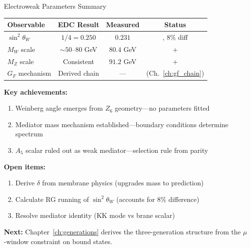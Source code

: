 \begin{statusbox}{Electroweak Parameters Summary}

\begin{center}
\renewcommand{\arraystretch}{1.3}
\begin{tabular}{lccc}
\toprule
\textbf{Observable} & \textbf{EDC Result} & \textbf{Measured} & \textbf{Status} \\
\midrule
$\sin^2\theta_W$ & $1/4 = 0.250$ & $0.231$ & \tagDc{}, 8\% diff \\
$M_W$ scale & $\sim 50$--$80$ GeV & $80.4$ GeV & \tagP{}+\tagDc{} \\
$M_Z$ scale & Consistent & $91.2$ GeV & \tagP{}+\tagDc{} \\
$G_F$ mechanism & Derived chain & --- & \tagDc{} (Ch.~\ref{ch:gf_chain}) \\
\bottomrule
\end{tabular}
\end{center}

\textbf{Key achievements:}
\begin{enumerate}[nosep]
\item Weinberg angle emerges from $Z_6$ geometry---no parameters fitted
\item Mediator mass mechanism established---boundary conditions determine spectrum
\item $A_5$ scalar ruled out as weak mediator---selection rule from parity
\end{enumerate}

\textbf{Open items:}
\begin{enumerate}[nosep]
\item Derive $\delta$ from membrane physics (upgrades mass to prediction)
\item Calculate RG running of $\sin^2\theta_W$ (accounts for 8\% difference)
\item Resolve mediator identity (KK mode vs brane scalar)
\end{enumerate}
\end{statusbox}

\textbf{Next:} Chapter~\ref{ch:generations} derives the three-generation structure
from the $\mu$-window constraint on bound states.

